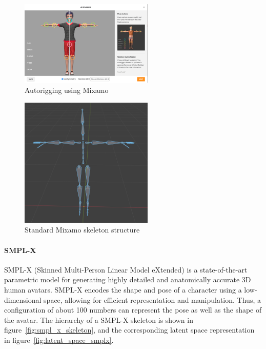 \documentclass[../../main.tex]{subfiles}
\begin{document}
\begin{figure} 
  \centering \includegraphics[width = 2.5in]{chapters/background_work/images/mixamo_autorigging.png} 
  \caption{Autorigging using Mixamo} 
  \label{fig:mixamo_autorigging} 
\end{figure}

\begin{figure} 
  \centering \includegraphics[width = 2.5in]{chapters/background_work/images/mixamo_skeleton.png} 
  \caption{Standard Mixamo skeleton structure} 
  \label{fig:mixamo_skeleton} 
\end{figure}

\paragraph{SMPL-X}
\label{ch:background_work:sign_language_synthesis:3d_techniques:skeleton:smpl_x}

SMPL-X (Skinned Multi-Person Linear Model eXtended) is a state-of-the-art parametric model for generating highly detailed and anatomically accurate 3D human avatars. SMPL-X encodes the shape and pose of a character using a low-dimensional space, allowing for efficient representation and manipulation. Thus, a configuration of about 100 numbers can represent the pose as well as the shape of the avatar. The hierarchy of a SMPL-X skeleton is shown in figure~\ref{fig:smpl_x_skeleton}, and the corresponding latent space representation in figure~\ref{fig:latent_space_smplx}.
\end{document}
